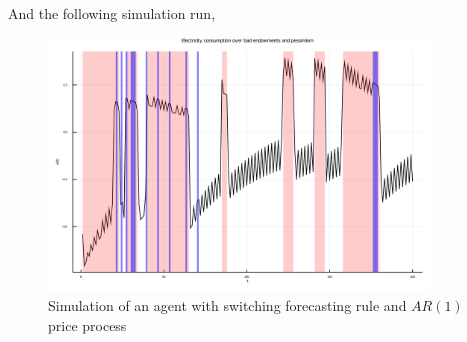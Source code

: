 \documentclass[american]{scrartcl}
\begin{document}
And the following simulation run,

\begin{figure}[h]
    \caption{Simulation of an agent with switching forecasting rule and $AR(1)$ price process}
    \centering
    \includegraphics[width=0.9\textwidth]{../../plots/markets/simul.png}
\end{figure}
\end{document}
